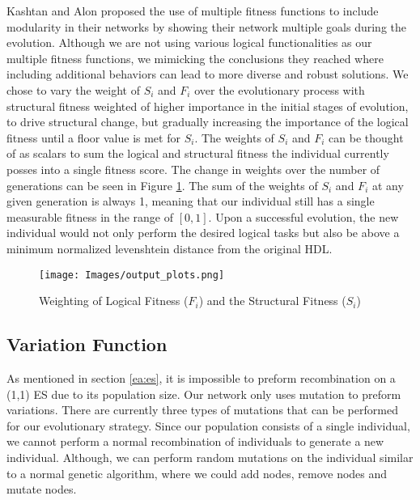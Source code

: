 \documentclass[conference]{IEEEtran}
\begin{document}
{\par Kashtan and Alon proposed the use of multiple fitness functions to include modularity in their networks by showing their network multiple goals during the evolution\cite{kashtan2005spontaneous}.
Although we are not using various logical functionalities as our multiple fitness functions, we mimicking the conclusions they reached where including additional behaviors can lead to more diverse and robust solutions.
We chose to vary the weight of $S_i$ and $F_i$ over the evolutionary process with structural fitness weighted of higher importance in the initial stages of evolution, to drive structural change, but gradually increasing the importance of the logical fitness until a floor value is met for $S_i$.
The weights of $S_i$ and $F_i$ can be thought of as scalars to sum the logical and structural fitness the individual currently posses into a single fitness score.
The change in weights over the number of generations can be seen in Figure \ref{fig:fitness_plots}.
The sum of the weights of $S_i$ and $F_i$ at any given generation is always 1, meaning that our individual still has a single measurable fitness in the range of $[0,1]$. 
Upon a successful evolution, the new individual would not only perform the desired logical tasks but also be above a minimum normalized levenshtein distance from the original HDL.


\begin{figure}[t]
    \centering
    \texttt{[image: Images/output\_plots.png]}
    \caption{Weighting of Logical Fitness ($F_i$) and the Structural Fitness ($S_i$)}
    \label{fig:fitness_plots}
\end{figure}


\subsection{Variation Function}
\label{net:variation}
\par As mentioned in section \ref{ea:es}, it is impossible to preform recombination on a (1,1) ES due to its population size.
Our network only uses mutation to preform variations.
There are currently three types of mutations that can be performed for our evolutionary strategy. 
Since our population consists of a single individual, we cannot perform a normal recombination of individuals to generate a new individual.
Although, we can perform random mutations on the individual similar to a normal genetic algorithm, where we could add nodes, remove nodes and mutate nodes.
}
\end{document}
